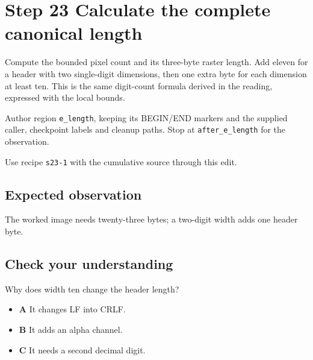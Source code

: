 \section{Step 23 Calculate the complete canonical length}\label{ppm-s23}

Compute the bounded pixel count and its three-byte raster length. Add eleven for a header with two single-digit dimensions, then one extra byte for each dimension at least ten. This is the same digit-count formula derived in the reading, expressed with the local bounds.

Author region \texttt{e\_length}, keeping its BEGIN/END markers and the supplied caller, checkpoint labels and cleanup paths. Stop at \texttt{after\_e\_length} for the observation.

Use recipe \texttt{s23-1} with the cumulative source through this edit.

\subsection{Expected observation}
The worked image needs twenty-three bytes; a two-digit width adds one header byte.

\subsection{Check your understanding}
Why does width ten change the header length?

\begin{itemize}
\item \textbf{A} It changes LF into CRLF.
\item \textbf{B} It adds an alpha channel.
\item \textbf{C} It needs a second decimal digit.
\end{itemize}
